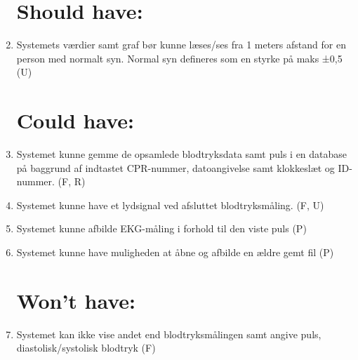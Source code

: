 \begin{enumerate}[4.1]
\section{Should have:}
		\item Systemets værdier samt graf bør kunne læses/ses fra 1 meters afstand for en person med normalt syn. Normal syn defineres som en styrke på maks ±0,5 (U)
	
\section{Could have:}
	\item Systemet kunne gemme de opsamlede blodtryksdata samt puls i en database på baggrund af indtastet CPR-nummer, datoangivelse samt klokkeslæt og ID-nummer. (F, R)
	\item Systemet kunne have et lydsignal ved afsluttet blodtryksmåling. (F, U)
	\item Systemet kunne afbilde EKG-måling i forhold til den viste puls (P)
	\item Systemet kunne have muligheden at åbne og afbilde en ældre gemt fil (P)
	

\section{Won't have:}
	\item Systemet kan ikke vise andet end blodtryksmålingen samt angive puls, diastolisk/systolisk blodtryk (F) 
\end{enumerate}